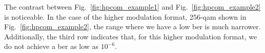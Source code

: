 
The contrast between Fig.~\ref{fig:hpcom_example1} and Fig.~\ref{fig:hpcom_example2} is noticeable. In the case of the higher modulation format, 256-\acrshort{qam} shown in Fig.~\ref{fig:hpcom_example2}, the range where we have a low \gls{ber} is much narrower. Additionally, the third row indicates that, for this higher modulation format, we do not achieve a \acrshort{ber} as low as $10^{-6}$.



\begin{figure}[htpb]
    \begin{minipage}[h]{0.48\linewidth}
    \end{minipage}
    \hfill
    \begin{minipage}[h]{0.48\linewidth}
    \center{
}
\end{minipage}
\end{figure}
